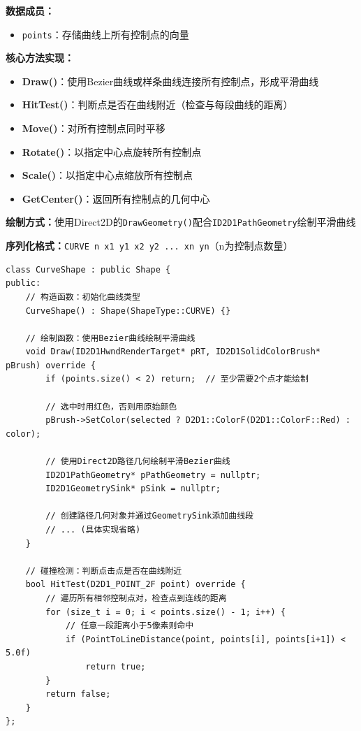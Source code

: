 \documentclass[12pt,a4paper]{article}
\begin{document}
\begin{tcolorbox}
\textbf{数据成员：}
\begin{itemize}
    \item \texttt{points}：存储曲线上所有控制点的向量
\end{itemize}

\textbf{核心方法实现：}
\begin{itemize}
    \item \textbf{Draw()}：使用Bezier曲线或样条曲线连接所有控制点，形成平滑曲线
    \item \textbf{HitTest()}：判断点是否在曲线附近（检查与每段曲线的距离）
    \item \textbf{Move()}：对所有控制点同时平移
    \item \textbf{Rotate()}：以指定中心点旋转所有控制点
    \item \textbf{Scale()}：以指定中心点缩放所有控制点
    \item \textbf{GetCenter()}：返回所有控制点的几何中心
\end{itemize}

\textbf{绘制方式：}使用Direct2D的\texttt{DrawGeometry()}配合\texttt{ID2D1PathGeometry}绘制平滑曲线

\textbf{序列化格式：}\texttt{CURVE n x1 y1 x2 y2 ... xn yn}（n为控制点数量）
\end{tcolorbox}

\begin{lstlisting}[caption=CurveShape类定义]
class CurveShape : public Shape {
public:
    // 构造函数：初始化曲线类型
    CurveShape() : Shape(ShapeType::CURVE) {}
    
    // 绘制函数：使用Bezier曲线绘制平滑曲线
    void Draw(ID2D1HwndRenderTarget* pRT, ID2D1SolidColorBrush* pBrush) override {
        if (points.size() < 2) return;  // 至少需要2个点才能绘制
        
        // 选中时用红色，否则用原始颜色
        pBrush->SetColor(selected ? D2D1::ColorF(D2D1::ColorF::Red) : color);
        
        // 使用Direct2D路径几何绘制平滑Bezier曲线
        ID2D1PathGeometry* pPathGeometry = nullptr;
        ID2D1GeometrySink* pSink = nullptr;
        
        // 创建路径几何对象并通过GeometrySink添加曲线段
        // ... (具体实现省略)
    }
    
    // 碰撞检测：判断点击点是否在曲线附近
    bool HitTest(D2D1_POINT_2F point) override {
        // 遍历所有相邻控制点对，检查点到连线的距离
        for (size_t i = 0; i < points.size() - 1; i++) {
            // 任意一段距离小于5像素则命中
            if (PointToLineDistance(point, points[i], points[i+1]) < 5.0f)
                return true;
        }
        return false;
    }
};
\end{lstlisting}
\end{document}
